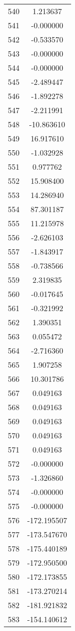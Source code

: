 \documentclass[12pt]{article}
\begin{document}
\begin{longtable}{@{}cc@{}}
540 & 1.213637 \\
541 & -0.000000 \\
542 & -0.533570 \\
543 & -0.000000 \\
544 & -0.000000 \\
545 & -2.489447 \\
546 & -1.892278 \\
547 & -2.211991 \\
548 & -10.863610 \\
549 & 16.917610 \\
550 & -1.032928 \\
551 & 0.977762 \\
552 & 15.908400 \\
553 & 14.286940 \\
554 & 87.301187 \\
555 & 11.215978 \\
556 & -2.626103 \\
557 & -1.843917 \\
558 & -0.738566 \\
559 & 2.319835 \\
560 & -0.017645 \\
561 & -0.321992 \\
562 & 1.390351 \\
563 & 0.055472 \\
564 & -2.716360 \\
565 & 1.907258 \\
566 & 10.301786 \\
567 & 0.049163 \\
568 & 0.049163 \\
569 & 0.049163 \\
570 & 0.049163 \\
571 & 0.049163 \\
572 & -0.000000 \\
573 & -1.326860 \\
574 & -0.000000 \\
575 & -0.000000 \\
576 & -172.195507 \\
577 & -173.547670 \\
578 & -175.440189 \\
579 & -172.950500 \\
580 & -172.173855 \\
581 & -173.270214 \\
582 & -181.921832 \\
583 & -154.140612 \\

\end{longtable}
\end{document}
